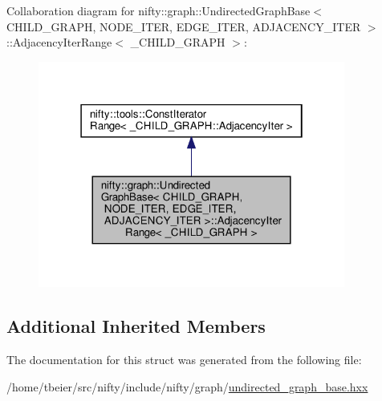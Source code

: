 Collaboration diagram for nifty\+:\+:graph\+:\+:Undirected\+Graph\+Base$<$ C\+H\+I\+L\+D\+\_\+\+G\+R\+A\+PH, N\+O\+D\+E\+\_\+\+I\+T\+ER, E\+D\+G\+E\+\_\+\+I\+T\+ER, A\+D\+J\+A\+C\+E\+N\+C\+Y\+\_\+\+I\+T\+ER $>$\+:\+:Adjacency\+Iter\+Range$<$ \+\_\+\+C\+H\+I\+L\+D\+\_\+\+G\+R\+A\+PH $>$\+:
\nopagebreak
\begin{figure}[H]
\begin{center}
\leavevmode
\includegraphics[width=286pt]{structnifty_1_1graph_1_1UndirectedGraphBase_1_1AdjacencyIterRange__coll__graph}
\end{center}
\end{figure}
\subsection*{Additional Inherited Members}


The documentation for this struct was generated from the following file\+:\begin{DoxyCompactItemize}
\item 
/home/tbeier/src/nifty/include/nifty/graph/\hyperlink{undirected__graph__base_8hxx}{undirected\+\_\+graph\+\_\+base.\+hxx}\end{DoxyCompactItemize}
